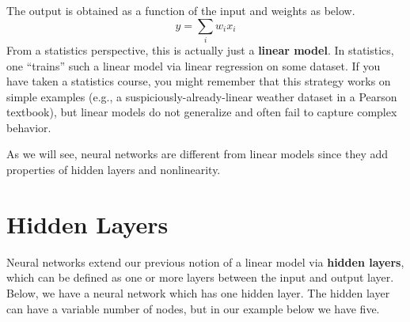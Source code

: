 \documentclass[12pt,letterpaper]{book}
\theoremstyle{definition}
\begin{document}
  The output is obtained as a function of the input and weights as below.
  \[
    y = \sum_{i} w_ix_i  
  \] 
  From a statistics perspective, this is actually just a \textbf{linear model}. In statistics, 
  one ``trains'' such a linear model via linear regression on some dataset. If you have 
  taken a statistics course, you might remember that this strategy works on simple 
  examples (e.g., a suspiciously-already-linear weather dataset in a Pearson textbook), 
  but linear models do not generalize and often fail to capture complex behavior.

  As we will see, neural networks are different from linear models since they add properties 
  of hidden layers and nonlinearity.
  
  \section{Hidden Layers}

  Neural networks extend our previous notion of a linear model via \textbf{hidden layers}, which can 
  be defined as one or more layers between the input and output layer. Below, we have 
  a neural network which has one hidden layer. The hidden layer can 
  have a variable number of nodes, but in our example below we have five.
\end{document}
